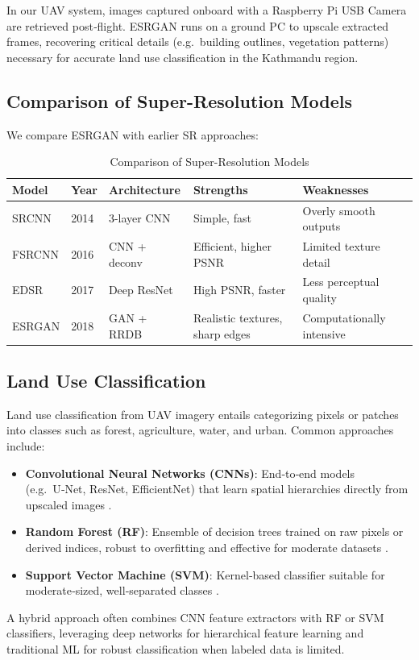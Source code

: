 In our UAV system, images captured onboard with a Raspberry Pi USB Camera are retrieved post‑flight. ESRGAN runs on a ground PC to upscale extracted frames, recovering critical details (e.g.\ building outlines, vegetation patterns) necessary for accurate land use classification in the Kathmandu region.

\subsection{Comparison of Super-Resolution Models}
We compare ESRGAN with earlier SR approaches:

\begin{table}[H]
\centering
\renewcommand{\arraystretch}{1.2}
\setlength{\tabcolsep}{6pt}
\begin{tabular}{@{} l l p{3cm} p{3cm} p{3cm} @{}}
    \toprule
    \textbf{Model} & \textbf{Year} & \textbf{Architecture} & \textbf{Strengths} & \textbf{Weaknesses} \\
    \midrule
    SRCNN   & 2014 & 3-layer CNN & Simple, fast & Overly smooth outputs \cite{dong2016srcnn} \\
    FSRCNN  & 2016 & CNN + deconv & Efficient, higher PSNR \cite{dong2016srcnn} & Limited texture detail \\
    EDSR    & 2017 & Deep ResNet & High PSNR, faster \cite{lim2017edsr} & Less perceptual quality \\
    ESRGAN  & 2018 & GAN + RRDB & Realistic textures, sharp edges \cite{wang2018esrgan} & Computationally intensive \\
    \bottomrule
  \end{tabular}
  \caption{Comparison of Super-Resolution Models}
\label{tab:sr_models}
\end{table}


\subsection{Land Use Classification}
Land use classification from UAV imagery entails categorizing pixels or patches into classes such as forest, agriculture, water, and urban. Common approaches include:
\begin{itemize}
  \item \textbf{Convolutional Neural Networks (CNNs)}: End‑to‑end models (e.g.\ U‑Net, ResNet, EfficientNet) that learn spatial hierarchies directly from upscaled images \cite{bhuju2019cnn}.
  \item \textbf{Random Forest (RF)}: Ensemble of decision trees trained on raw pixels or derived indices, robust to overfitting and effective for moderate datasets \cite{bhuju2019cnn}\cite{dong2016srcnn}.
  \item \textbf{Support Vector Machine (SVM)}: Kernel‑based classifier suitable for moderate‑sized, well‑separated classes \cite{bhuju2019cnn}\cite{dong2016srcnn}.
\end{itemize}
A hybrid approach often combines CNN feature extractors with RF or SVM classifiers, leveraging deep networks for hierarchical feature learning and traditional ML for robust classification when labeled data is limited.

